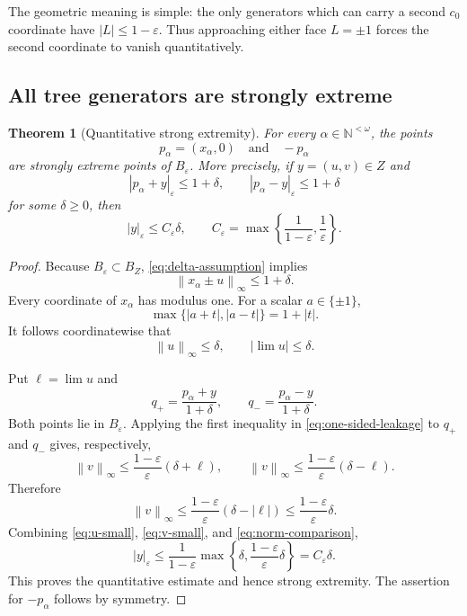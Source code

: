 \documentclass[11pt]{article}
\newtheorem{theorem}{Theorem}[section]
\newcommand{\N}{\mathbb N}
\newcommand{\eps}{\varepsilon}
\newcommand{\norm}[1]{\left\lVert #1\right\rVert}
\newcommand{\abs}[1]{\left\lvert #1\right\rvert}
\newcommand{\sourceNorm}[1]{\left\lvert #1\right\rvert_{\eps}}
\begin{document}
The geometric meaning is simple: the only generators which can carry a second $c_0$ coordinate have $\abs{L}\le1-\eps$.  Thus approaching either face $L=\pm1$ forces the second coordinate to vanish quantitatively.

\subsection{All tree generators are strongly extreme}

\begin{theorem}[Quantitative strong extremity]
\label{thm:tree-strong}
For every $\alpha\in\N^{<\omega}$, the points
\[
 p_\alpha=(x_\alpha,0)
 \quad\text{and}\quad
 -p_\alpha
\]
are strongly extreme points of $B_\eps$.  More precisely, if $y=(u,v)\in Z$ and
\begin{equation}
\label{eq:delta-assumption}
 \sourceNorm{p_\alpha+y}\le1+\delta,
 \qquad
 \sourceNorm{p_\alpha-y}\le1+\delta
\end{equation}
for some $\delta\ge0$, then
\begin{equation}
\label{eq:strong-modulus}
 \sourceNorm{y}
 \le C_\eps\delta,
 \qquad
 C_\eps=\max\left\{\frac1{1-\eps},\frac1\eps\right\}.
\end{equation}
\end{theorem}

\begin{proof}
Because $B_\eps\subset B_Z$, \eqref{eq:delta-assumption} implies
\[
 \norm{x_\alpha\pm u}_\infty\le1+\delta.
\]
Every coordinate of $x_\alpha$ has modulus one.  For a scalar $a\in\{\pm1\}$,
\[
 \max\{\abs{a+t},\abs{a-t}\}=1+\abs{t}.
\]
It follows coordinatewise that
\begin{equation}
\label{eq:u-small}
 \norm{u}_\infty\le\delta,
 \qquad
 \abs{\lim u}\le\delta.
\end{equation}

Put $\ell=\lim u$ and
\[
 q_+=\frac{p_\alpha+y}{1+\delta},
 \qquad
 q_-=\frac{p_\alpha-y}{1+\delta}.
\]
Both points lie in $B_\eps$.  Applying the first inequality in \eqref{eq:one-sided-leakage} to $q_+$ and $q_-$ gives, respectively,
\[
 \norm{v}_\infty
 \le \frac{1-\eps}{\eps}(\delta+\ell),
 \qquad
 \norm{v}_\infty
 \le \frac{1-\eps}{\eps}(\delta-\ell).
\]
Therefore
\begin{equation}
\label{eq:v-small}
 \norm{v}_\infty
 \le\frac{1-\eps}{\eps}(\delta-\abs{\ell})
 \le\frac{1-\eps}{\eps}\delta.
\end{equation}
Combining \eqref{eq:u-small}, \eqref{eq:v-small}, and \eqref{eq:norm-comparison},
\[
 \sourceNorm{y}
 \le\frac1{1-\eps}\max\left\{\delta,\frac{1-\eps}{\eps}\delta\right\}
 =C_\eps\delta.
\]
This proves the quantitative estimate and hence strong extremity.  The assertion for $-p_\alpha$ follows by symmetry.
\end{proof}
\end{document}
